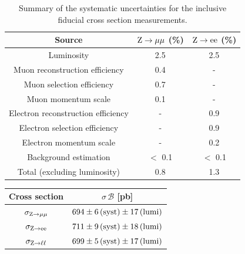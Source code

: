 \begin{table}[hbtp]
  \begin{center}
\caption{Summary of the systematic uncertainties for the 
inclusive fiducial cross section measurements.\label{tab:syst_xs}}
\begin{tabular}{ccc}
\hline
Source      & $\mathrm{Z} \to \mu\mu$ (\%) & $\mathrm{Z} \to \mathrm{e}\mathrm{e}$ (\%) \\
\hline
Luminosity                         & 2.5     & 2.5     \\
\hline
Muon reconstruction efficiency     & 0.4     &  -      \\
Muon selection efficiency          & 0.7     &  -      \\
Muon momentum scale                & 0.1     &  -      \\
Electron reconstruction efficiency &  -      & 0.9     \\
Electron selection efficiency      &  -      & 0.9     \\
Electron momentum scale            &  -      & 0.2     \\
Background estimation              & $<$ 0.1 & $<$ 0.1 \\
\hline
Total (excluding luminosity)       & 0.8     & 1.3     \\
\hline
  \end{tabular}
  \end{center}
\end{table}


\begin{table}[htb]
\begin{center}
\begin{tabular}{c|c}
\hline
Cross section                             & $\sigma \, \mathcal{B}$ [pb] \\
\hline
$\sigma_{\mathrm{Z} \to \mu\mu}$        & $694\pm6\,\text{(syst)}\pm17\,\text{(lumi)}$ \\
$\sigma_{\mathrm{Z} \to \mathrm{e}\mathrm{e}}$  & $711\pm9\,\text{(syst)}\pm18\,\text{(lumi)}$\\
$\sigma_{\mathrm{Z} \to \ell\ell}$       & $699\pm5\,\text{(syst)}\pm17\,\text{(lumi)}$ \\
\hline
\end{tabular}
\label{tab:totCross}
\end{center}
\end{table}



